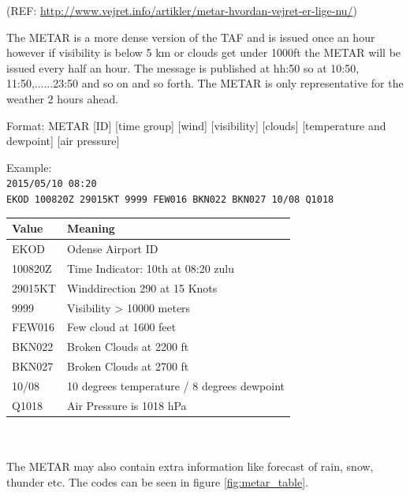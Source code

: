 (REF: \url{http://www.vejret.info/artikler/metar-hvordan-vejret-er-lige-nu/})

The METAR is a more dense version of the TAF and is issued once an hour however if visibility is below 5 km or clouds get under 1000ft the METAR will be issued every half an hour. The message is published at hh:50 so at 10:50, 11:50,......23:50 and so on and so forth. The METAR is only representative for the weather 2 hours ahead.

Format:
METAR [ID] [time group] [wind] [visibility] [clouds] [temperature and dewpoint] [air pressure]

Example:\\
\verb|2015/05/10 08:20|\\
\verb|EKOD 100820Z 29015KT 9999 FEW016 BKN022 BKN027 10/08 Q1018|

\begin{tabular}{ll}
	\toprule
	\textbf{Value} & \textbf{Meaning}                            \\\midrule
	EKOD           & Odense Airport ID                           \\
	100820Z        & Time Indicator: 10th at 08:20 zulu          \\
	29015KT        & Winddirection 290 at 15 Knots               \\
	9999           & Visibility > 10000 meters                   \\
	FEW016         & Few cloud at 1600 feet                      \\
	BKN022         & Broken Clouds at 2200 ft                    \\
	BKN027         & Broken Clouds at 2700 ft                    \\
	10/08          & 10 degrees temperature / 8 degrees dewpoint \\
	Q1018          & Air Pressure is 1018 hPa                    \\\bottomrule
\end{tabular}
~\\~\\
The METAR may also contain extra information like forecast of rain, snow, thunder etc. The codes can be seen in figure \vref{fig:metar_table}.

